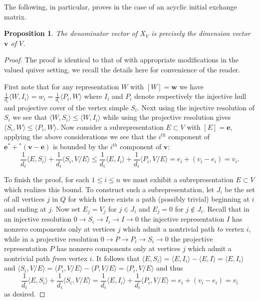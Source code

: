\documentclass[12pt]{amsart}
\newtheorem{proposition}[theorem]{Proposition}
\newcommand{\bfe}{\mathbf{e}}
\newcommand{\bfv}{\mathbf{v}}
\newcommand{\bfw}{\mathbf{w}}
\begin{document}
  The following, in particular, proves \cite[Conj. 1.9]{reading-stella} in the case of an acyclic initial exchange matrix.
   \begin{proposition}
    \label{prop:denominators}
    The denominator vector of $X_V$ is precisely the dimension vector $\bfv$ of $V$.
  \end{proposition}
  \begin{proof}
    The proof is identical to that of \cite[Sec. 4, Cor. 2]{caldero-keller} with appropriate modifications in the valued quiver setting, we recall the details here for convenience of the reader.  

    First note that for any representation $W$ with $[W]=\bfw$ we have $\frac{1}{d_i}\langle W,I_i\rangle=w_i=\frac{1}{d_i}\langle P_i,W\rangle$ where $I_i$ and $P_i$ denote respectively the injective hull and projective cover of the vertex simple $S_i$.  Next using the injective resolution of $S_i$ we see that $\langle W,S_i\rangle\le\langle W,I_i\rangle$ while using the projective resolution gives $\langle S_i,W\rangle\le\langle P_i,W\rangle$.  Now consider a subrepresentation $E\subset V$ with $[E]=\bfe$, applying the above considerations we see that the $i^{th}$ component of $\bfe^*+{}^*(\bfv-\bfe)$ is bounded by the $i^{th}$ component of $\bfv$:
    \[\frac{1}{d_i}\langle E,S_i\rangle+\frac{1}{d_i}\langle S_i,V/E\rangle\le\frac{1}{d_i}\langle E,I_i\rangle+\frac{1}{d_i}\langle P_i,V/E\rangle=e_i+(v_i-e_i)=v_i.\]

    To finish the proof, for each $1\le i\le n$ we must exhibit a subrepresentation $E\subset V$ which realizes this bound.  
    To construct such a subrepresentation, let $J_i$ be the set of all vertices $j$ in $Q$ for which there exists a path (possibly trivial) beginning at $i$ and ending at $j$.  
    Now set $E_j=V_j$ for $j\in J_i$ and $E_j=0$ for $j\notin J_i$.  
    Recall that in an injective resolution $0\longrightarrow S_i\longrightarrow I_i\longrightarrow I\longrightarrow 0$ the injective representation $I$ has nonzero components only at vertices $j$ which admit a nontrivial path \emph{to} vertex $i$, while in a projective resolution $0\longrightarrow P\longrightarrow P_i\longrightarrow S_i\longrightarrow 0$ the projective representation $P$ has nonzero components only at vertices $j$ which admit a nontrivial path \emph{from} vertex $i$.  
    It follows that $\langle E,S_i\rangle=\langle E,I_i\rangle-\langle E,I\rangle=\langle E,I_i\rangle$ and $\langle S_i,V/E\rangle=\langle P_i,V/E\rangle-\langle P,V/E\rangle=\langle P_i,V/E\rangle$ and thus 
    \[\frac{1}{d_i}\langle E,S_i\rangle+\frac{1}{d_i}\langle S_i,V/E\rangle=\frac{1}{d_i}\langle E,I_i\rangle+\frac{1}{d_i}\langle P_i,V/E\rangle=e_i+(v_i-e_i)=v_i\]
    as desired.
  \end{proof}
\end{document}
